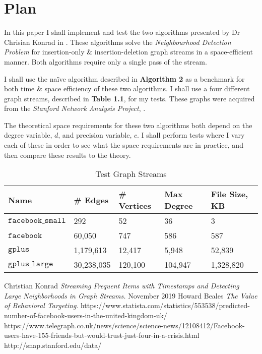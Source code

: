 \documentclass[11pt,twoside,a4paper]{report}
\begin{document}
\section{Plan}
In this paper I shall implement and test the two algorithms presented by Dr Chrisian Konrad in \cite{orig}. These algorithms solve the \textit{Neighbourhood Detection Problem} for insertion-only \& insertion-deletion graph streams in a space-efficient manner. Both algorithms require only a single pass of the stream.
\par I shall use the na\"ive algorithm described in \textbf{Algorithm 2} as a benchmark for both time \& space efficiency of these two algorithms. I shall use a four different graph streams, described in \textbf{Table 1.1}, for my tests. %
These graphs were acquired from the \textit{Stanford Network Analysis Project}, \cite{SNAP}.
\par The theoretical space requirements for these two algorithms both depend on the degree variable, $d$, and precision variable, $c$. I shall perform tests where I vary each of these in order to see what the space requirements are in practice, and then compare these results to the theory.

\begin{table}[h]
\caption{Test Graph Streams}
\begin{tabular}{|l|l|l|l|l|}
\hline
Name&\# Edges&\# Vertices&Max Degree&File Size, KB\\\hline
$\mathtt{facebook\_small}$&292&52&36&3\\
$\mathtt{facebook}$&60,050&747&586&587\\
$\mathtt{gplus}$&1,179,613&12,417&5,948&52,839\\
$\mathtt{gplus\_large}$&30,238,035&120,100&104,947&1,328,820\\\hline
\end{tabular}
\label{Tab:Tcr}
\end{table}

\begin{thebibliography}{9}
 Christian Konrad \textit{Streaming Frequent Items with Timestamps and Detecting Large Neighborhoods in Graph Streams.} November 2019
 Howard Beales \textit{The Value of Behavioral Targeting}.
 https://www.statista.com/statistics/553538/predicted-number-of-facebook-users-in-the-united-kingdom-uk/
 https://www.telegraph.co.uk/news/science/science-news/12108412/Facebook-users-have-155-friends-but-would-trust-just-four-in-a-crisis.html
http://snap.stanford.edu/data/
\end{thebibliography}
\end{document}
